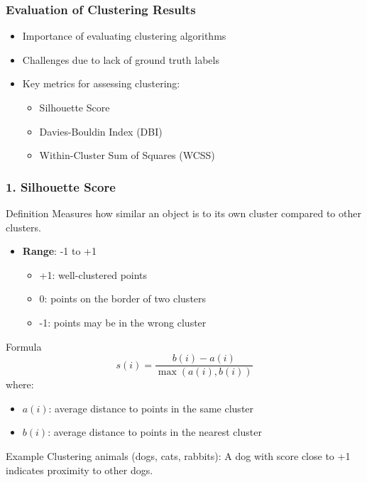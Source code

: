 \documentclass[aspectratio=169]{beamer}
\begin{document}
\begin{frame}[fragile]
    \frametitle{Evaluation of Clustering Results}
    \begin{itemize}
        \item Importance of evaluating clustering algorithms
        \item Challenges due to lack of ground truth labels
        \item Key metrics for assessing clustering:
        \begin{itemize}
            \item Silhouette Score
            \item Davies-Bouldin Index (DBI)
            \item Within-Cluster Sum of Squares (WCSS)
        \end{itemize}
    \end{itemize}
\end{frame}

\begin{frame}[fragile]
    \frametitle{1. Silhouette Score}
    \begin{block}{Definition}
        Measures how similar an object is to its own cluster compared to other clusters.
    \end{block}
    \begin{itemize}
        \item \textbf{Range}: -1 to +1
            \begin{itemize}
                \item +1: well-clustered points
                \item 0: points on the border of two clusters
                \item -1: points may be in the wrong cluster
            \end{itemize}
    \end{itemize}
    
    \begin{block}{Formula}
        \[
        s(i) = \frac{b(i) - a(i)}{\max(a(i), b(i))}
        \]
        where:
        \begin{itemize}
            \item \(a(i)\): average distance to points in the same cluster
            \item \(b(i)\): average distance to points in the nearest cluster
        \end{itemize}
    \end{block}
    
    \begin{block}{Example}
        Clustering animals (dogs, cats, rabbits): A dog with score close to +1 indicates proximity to other dogs.
    \end{block}
\end{frame}
\end{document}

